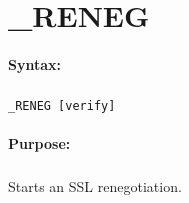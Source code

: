 
\newpage
\section{\_RENEG}
\label{cmd:_RENEG}

\paragraph{Syntax:}
\subparagraph{}
\texttt{\_RENEG [verify]}

\paragraph{Purpose:}
\subparagraph{}
Starts an SSL renegotiation.

